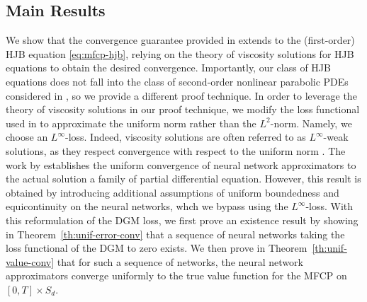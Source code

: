 \documentclass[11pt,reqno]{amsart}
\numberwithin{equation}{section}
\theoremstyle{plain}
\begin{document}
\subsection{Main Results}
\label{subsec:main-results}
We show that the convergence guarantee provided in \cite{dgm} extends to the (first-order) HJB equation \eqref{eq:mfcp-hjb}, relying on the theory of viscosity solutions for HJB equations to obtain the desired convergence. Importantly, our class of HJB equations does not fall into the class of second-order nonlinear parabolic PDEs considered in \cite{dgm}, so we provide a different proof technique. In order to leverage the theory of viscosity solutions in our proof technique, we modify the loss functional used in \cite{dgm} to approximate the uniform norm rather than the $L^2$-norm. Namely, we choose an $L^\infty$-loss. Indeed, viscosity solutions are often referred to as $L^\infty$-weak solutions, as they respect convergence with respect to the uniform norm \cite{crandall-evans-lions}. The work by \cite{dgm} establishes the uniform convergence of neural network approximators to the actual solution a family of partial differential equation. However, this result is obtained by introducing additional assumptions of uniform boundedness and equicontinuity on the neural networks, whch we bypass using the $L^\infty$-loss. With this reformulation of the DGM loss, we first prove an existence result by showing in Theorem~\ref{th:unif-error-conv} that a sequence of neural networks taking the loss functional of the DGM to zero exists. We then prove in Theorem~\ref{th:unif-value-conv} that for such a sequence of networks, the neural network approximators converge uniformly to the true value function for the MFCP on $[0, T] \times S_d$. 
\end{document}

